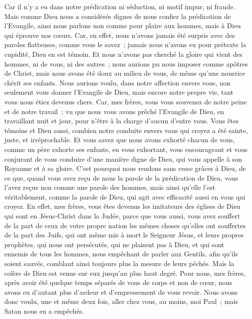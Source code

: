 \begin{multicols}{2}
Car il n'y a eu dans notre prédication ni séduction, ni motif impur, ni fraude.
Mais comme Dieu nous a considérés dignes de nous confier la prédication de l'Evangile, ainsi nous parlons non comme pour plaire aux hommes, mais à Dieu qui éprouve nos cœurs.
Car, en effet, nous n'avons jamais été surpris avec des paroles flatteuses, comme vous le savez~; jamais nous n'avons eu pour prétexte la cupidité, Dieu en est témoin.
Et nous n'avons pas cherché la gloire qui vient des hommes, ni de vous, ni des autres~; nous aurions pu nous imposer comme apôtres de Christ,
mais nous avons été doux au milieu de vous, de même qu'une nourrice chérit ses enfants.
Nous aurions voulu, dans notre affection envers vous, non seulement vous donner l'Evangile de Dieu, mais encore notre propre vie, tant vous nous étiez devenus chers.
Car, mes frères, vous vous souvenez de notre peine et de notre travail~; vu que nous vous avons prêché l'Evangile de Dieu, en travaillant nuit et jour, pour n'être à la charge d'aucun d'entre vous.
Vous êtes témoins et Dieu aussi, combien notre conduite envers vous qui croyez a été sainte, juste, et irréprochable.
Et vous savez que nous avons exhorté chacun de vous, comme un père exhorte ses enfants,
en vous exhortant, vous encourageant et vous conjurant de vous conduire d'une manière digne de Dieu, qui vous appelle à son Royaume et à sa gloire.
C'est pourquoi nous rendons sans cesse grâces à Dieu, de ce que, quand vous avez reçu de nous la parole de la prédication de Dieu, vous l'avez reçue non comme une parole des hommes, mais ainsi qu'elle l'est véritablement, comme la parole de Dieu, qui agit avec efficacité aussi en vous qui croyez.
En effet, mes frères, vous êtes devenus les imitateurs des églises de Dieu qui sont en Jésus-Christ dans la Judée, parce que vous aussi, vous avez souffert de la part de ceux de votre propre nation les mêmes choses qu'elles ont souffertes de la part des Juifs,
qui ont même mis à mort le Seigneur Jésus, et leurs propres prophètes, qui nous ont persécutés, qui ne plaisent pas à Dieu, et qui sont ennemis de tous les hommes,
nous empêchant de parler aux Gentils, afin qu'ils soient sauvés, comblant ainsi toujours plus la mesure de leurs péchés. Mais la colère de Dieu est venue sur eux jusqu'au plus haut degré.
Pour nous, mes frères, après avoir été quelque temps séparés de vous de corps et non de cœur, nous avons eu d'autant plus d'ardeur et d'empressement de vous revoir.
Nous avons donc voulu, une et même deux fois, aller chez vous, au moins, moi Paul~; mais Satan nous en a empêchés.

\end{multicols}
